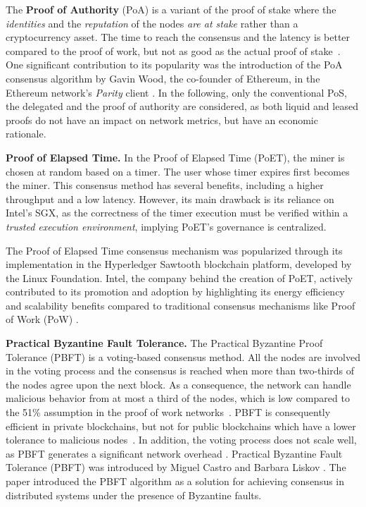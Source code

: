 The \textbf{Proof of Authority} (PoA) is a variant of the proof of stake where the \emph{identities} and the \emph{reputation} of the nodes \emph{are at stake} rather than a cryptocurrency asset. The time to reach the consensus and the latency is better compared to the proof of work, but not as good as the actual proof of stake~\cite{Raghav2020}.
One significant contribution to its popularity was the introduction of the PoA consensus algorithm by Gavin Wood, the co-founder of Ethereum, in the Ethereum network's \emph{Parity} client \cite{Ekparinya2020}.
In the following, only the conventional PoS, the delegated and the proof of authority are considered, as both liquid and leased proofs do 
not have an impact on network metrics, but have an economic rationale.

\textbf{Proof of Elapsed Time.} In the Proof of Elapsed Time (PoET), the miner is chosen at random based on a timer. The user whose timer expires first becomes the miner. This consensus method has several benefits,
including a higher throughput and a low latency.
However, its main drawback is its reliance on Intel's SGX, as the correctness of the timer execution must be verified within a \emph{trusted execution environment}, implying PoET's governance is centralized.
 
The Proof of Elapsed Time consensus mechanism was popularized through its implementation in the Hyperledger Sawtooth blockchain platform, developed by the Linux Foundation. 
Intel, the company behind the creation of PoET, actively contributed to its promotion and adoption by highlighting its energy efficiency and scalability benefits compared to traditional consensus mechanisms like Proof of Work (PoW) \cite{NDSSWang2022}.

\textbf{Practical Byzantine Fault Tolerance.}
The Practical Byzantine Proof Tolerance (PBFT) is a voting-based consensus method. All the nodes are involved in the voting process and the consensus is reached when more than two-thirds of the nodes agree 
upon the next block. As a consequence, the network can handle malicious behavior from at most a third of the nodes, 
which is low compared to the 51\% assumption in the proof of work networks~\cite{Aponte2021}. PBFT is consequently efficient in private blockchains, but not for public blockchains which
have a lower tolerance to malicious nodes~\cite{Salimitari2020}. In addition, the voting process does not scale well, as PBFT generates a significant network 
overhead \cite{Salimitari2020}. 
Practical Byzantine Fault Tolerance (PBFT) was introduced by Miguel Castro and Barbara Liskov \cite{Castro1999}.
 The paper introduced the PBFT algorithm as a solution for achieving consensus in distributed systems under the presence of Byzantine faults.

